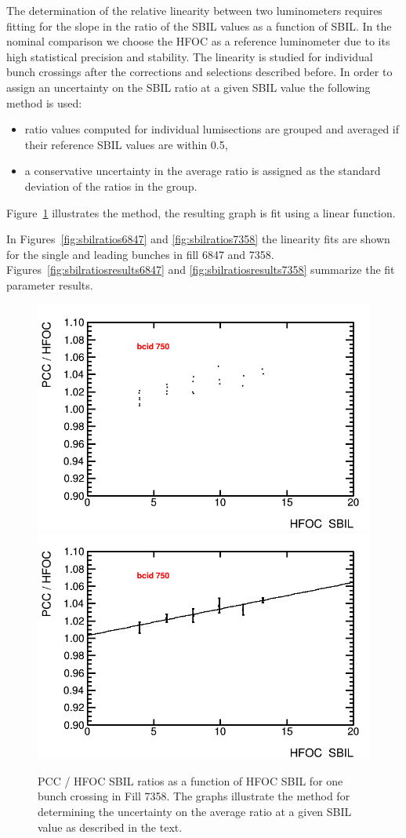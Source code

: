 
The determination of the relative linearity between two luminometers requires fitting for the slope in the ratio of the SBIL values as a function of SBIL.
In the nominal comparison we choose the HFOC as a reference luminometer due to its high statistical precision and stability.
The linearity is studied for individual bunch crossings after the corrections and selections described before.
In order to assign an uncertainty on the SBIL ratio at a given SBIL value the following method is used:
\begin{itemize}
\item ratio values computed for individual lumisections are grouped and averaged if their reference SBIL values are within 0.5,
\item a conservative uncertainty in the average ratio is assigned as the standard deviation of the ratios in the group.
\end{itemize}
Figure~\ref{fig:sbilratiomethod} illustrates the method, the resulting graph is fit using a linear function.


In Figures~\ref{fig:sbilratios6847} and \ref{fig:sbilratios7358} the linearity fits are shown for the single and leading bunches in fill 6847 and 7358.
Figures~\ref{fig:sbilratiosresults6847} and \ref{fig:sbilratiosresults7358} summarize  the fit parameter results.


\begin{figure}[t]
  \begin{center}
    \includegraphics[width=0.47\linewidth]{plots/plot_det_linearity_perbx_pcc_7358_750_scatter.png}
    \includegraphics[width=0.47\linewidth]{plots/plot_det_linearity_perbx_pcc_7358_750_avg.png}
    \caption{
      PCC / HFOC  SBIL ratios as a function of HFOC SBIL for one bunch crossing in Fill 7358.
      The graphs illustrate the method for determining the uncertainty on the average ratio at a given SBIL value as described in the text.
    \label{fig:sbilratiomethod}
    }
  \end{center}
\end{figure}

